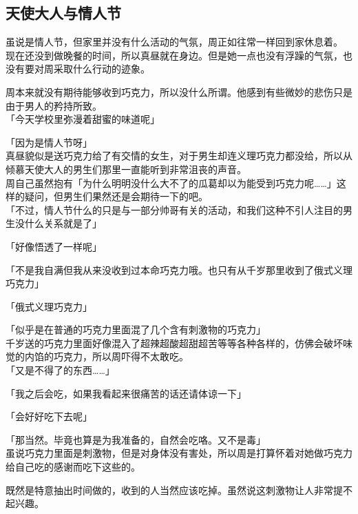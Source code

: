\subsection{天使大人与情人节}

虽说是情人节，但家里并没有什么活动的气氛，周正如往常一样回到家休息着。\\

现在还没到做晚餐的时间，所以真昼就在身边。但是她一点也没有浮躁的气氛，也没有要对周采取什么行动的迹象。

周本来就没有期待能够收到巧克力，所以没什么所谓。他感到有些微妙的悲伤只是由于男人的矜持所致。\\

「今天学校里弥漫着甜蜜的味道呢」

「因为是情人节呀」\\

真昼貌似是送巧克力给了有交情的女生，对于男生却连义理巧克力都没给，所以从倾慕天使大人的男生们那里一直能听到非常沮丧的声音。\\

周自己虽然抱有「为什么明明没什么大不了的瓜葛却以为能受到巧克力呢……」这样的疑问，但男生们果然还是会期待一下的吧。\\

「不过，情人节什么的只是与一部分帅哥有关的活动，和我们这种不引人注目的男生没什么关系就是了」

「好像悟透了一样呢」

「不是我自满但我从来没收到过本命巧克力哦。也只有从千岁那里收到了俄式义理巧克力」

「俄式义理巧克力」

「似乎是在普通的巧克力里面混了几个含有刺激物的巧克力」\\

千岁送的巧克力里面好像混入了超辣超酸超甜超苦等等各种各样的，仿佛会破坏味觉的内馅的巧克力，所以周吓得不太敢吃。\\

「又是不得了的东西……」

「我之后会吃，如果我看起来很痛苦的话还请体谅一下」

「会好好吃下去呢」

「那当然。毕竟也算是为我准备的，自然会吃咯。又不是毒」\\

虽说巧克力里面是刺激物，但是对身体没有害处，所以周是打算怀着对她做巧克力给自己吃的感谢而吃下这些的。

既然是特意抽出时间做的，收到的人当然应该吃掉。虽然说这刺激物让人非常提不起兴趣。\\

